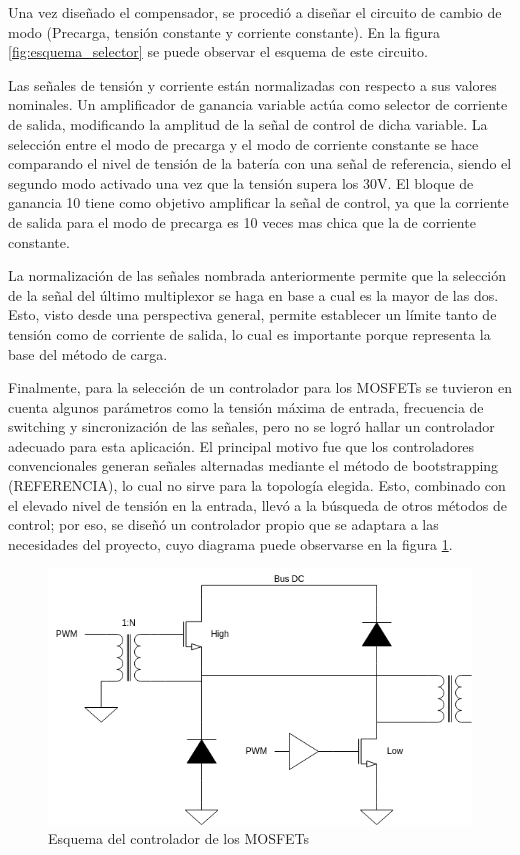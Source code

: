 Una vez diseñado el compensador, se procedió a diseñar el circuito de cambio de modo (Precarga, tensión constante y corriente constante).
En la figura \ref{fig:esquema_selector} se puede observar el esquema de este circuito.

Las señales de tensión y corriente están normalizadas con respecto a sus valores nominales.
Un amplificador de ganancia variable actúa como selector de corriente de salida,
modificando la amplitud de la señal de control de dicha variable.
La selección entre el modo de precarga y el modo de corriente constante se hace comparando el nivel de tensión de la batería
con una señal de referencia, siendo el segundo modo activado una vez que la tensión supera los 30V.
El bloque de ganancia 10 tiene como objetivo amplificar la señal de control, ya que la corriente de salida para el modo
de precarga es 10 veces mas chica que la de corriente constante.

La normalización de las señales nombrada anteriormente permite que la selección de la señal del último multiplexor
se haga en base a cual es la mayor de las dos. Esto, visto desde una perspectiva general, permite establecer un límite
tanto de tensión como de corriente de salida, lo cual es importante porque representa la base del método de carga.

Finalmente, para la selección de un controlador para los MOSFETs se tuvieron en cuenta algunos parámetros como
la tensión máxima de entrada, frecuencia de switching y sincronización de las señales,
pero no se logró hallar un controlador adecuado para esta aplicación.
El principal motivo fue que los controladores convencionales generan señales alternadas mediante el método de bootstrapping (REFERENCIA),
lo cual no sirve para la topología elegida. Esto, combinado con el elevado nivel de tensión en la entrada,
llevó a la búsqueda de otros métodos de control; por eso, se diseñó un controlador propio que se adaptara
a las necesidades del proyecto, cuyo diagrama puede observarse en la figura \ref{fig:driver}.

\begin{figure}
    \centering
    \includegraphics[width=\textwidth]{images/driver.png}
    \caption{Esquema del controlador de los MOSFETs}
    \label{fig:driver}
\end{figure}

